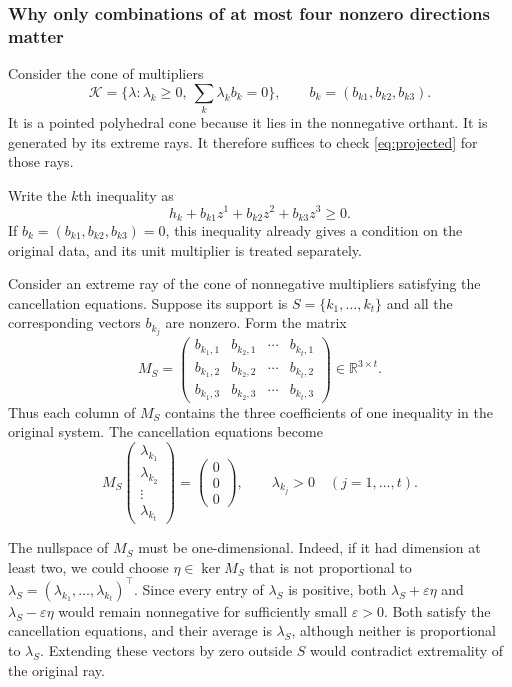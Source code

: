 \documentclass[a4paper,11pt]{amsart}
\numberwithin{equation}{section}
\theoremstyle{definition}
\theoremstyle{remark}
\begin{document}

\subsubsection{Why only combinations of at most four nonzero directions matter}
Consider the cone of multipliers
\[
 \mathcal K=\{\lambda:\lambda_k\ge0,\ \sum_k\lambda_k b_k=0\},
 \qquad b_k=(b_{k1},b_{k2},b_{k3}).
\]
It is a pointed polyhedral cone because it lies in the nonnegative orthant.
It is generated by its extreme rays. It therefore suffices to check
\eqref{eq:projected} for those rays.

Write the $k$th inequality as
\[
 h_k+b_{k1}z^1+b_{k2}z^2+b_{k3}z^3\ge0.
\]
If $b_k=(b_{k1},b_{k2},b_{k3})=0$, this inequality already gives
a condition on the original data, and its unit multiplier is treated
separately.

Consider an extreme ray of the cone of nonnegative multipliers
satisfying the cancellation equations. Suppose its support is
$S=\{k_1,\ldots,k_t\}$ and all the corresponding vectors $b_{k_j}$
are nonzero. Form the matrix
\[
 M_S=
 \begin{pmatrix}
 b_{k_1,1}&b_{k_2,1}&\cdots&b_{k_t,1}\\
 b_{k_1,2}&b_{k_2,2}&\cdots&b_{k_t,2}\\
 b_{k_1,3}&b_{k_2,3}&\cdots&b_{k_t,3}
 \end{pmatrix}
 \in\mathbb R^{3\times t}.
\]
Thus each column of $M_S$ contains the three coefficients of one
inequality in the original system. The cancellation equations become
\[
 M_S
 \begin{pmatrix}
 \lambda_{k_1}\\
 \lambda_{k_2}\\
 \vdots\\
 \lambda_{k_t}
 \end{pmatrix}
 =
 \begin{pmatrix}0\\0\\0\end{pmatrix},
 \qquad
 \lambda_{k_j}>0\quad(j=1,\ldots,t).
\]

The nullspace of $M_S$ must be one-dimensional. Indeed, if it had
dimension at least two, we could choose
$\eta\in\ker M_S$ that is not proportional to
$\lambda_S=(\lambda_{k_1},\ldots,\lambda_{k_t})^\top$.
Since every entry of $\lambda_S$ is positive, both
$\lambda_S+\varepsilon\eta$ and $\lambda_S-\varepsilon\eta$
would remain nonnegative for sufficiently small $\varepsilon>0$.
Both satisfy the cancellation equations, and their average is
$\lambda_S$, although neither is proportional to $\lambda_S$.
Extending these vectors by zero outside $S$ would contradict
extremality of the original ray.
\end{document}
